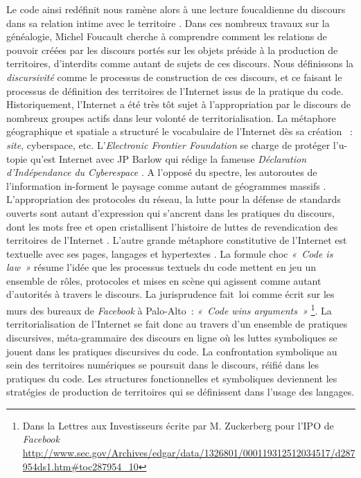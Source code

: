 Le code ainsi redéfinit nous ramène alors à une lecture foucaldienne du discours dans sa relation intime avec le territoire \citep{Foucault2004}. Dans ces nombreux travaux sur la généalogie, Michel Foucault cherche à comprendre comment les relations de pouvoir créées par les discours portés sur les objets préside à la production de territoires, d’interdits comme autant de sujets de ces discours. Nous définissons la \textit{discursivité} comme le processus de construction de ces discours, et ce faisant le processus de définition des territoires de l’Internet issus de la pratique du code. Historiquement, l’Internet a été très tôt sujet à l’appropriation par le discours de nombreux groupes actifs dans leur volonté de territorialisation. La métaphore géographique et spatiale a structuré le vocabulaire de l’Internet dès sa création \citep{Graham1998} : \textit{site}, cyberspace, etc. L’\textit{Electronic Frontier Foundation} se charge de protéger l’u-topie qu’est Internet avec JP Barlow qui rédige la fameuse \textit{Déclaration d’Indépendance du Cyberespace} \citep{Barlow2001}. A l’opposé du spectre, les autoroutes de l’information in-forment le paysage comme autant de géogrammes massifs \citep{Berque1999}. L’appropriation des protocoles du réseau, la lutte pour la défense de standards ouverts sont autant d’expression qui s’ancrent dans les pratiques du discours, dont les mots free et open cristallisent l’histoire de luttes de revendication des territoires de l’Internet \citep{Blondeau2000}. L’autre grande métaphore constitutive de l’Internet est textuelle avec ses pages, langages et hypertextes \citep{Vandendorpe1999}. La formule choc \textit{« Code is law »} \citep{Lessig2009} résume l’idée  que les processus textuels du code mettent en jeu un ensemble de rôles, protocoles et mises en scène qui agissent comme autant d’autorités à travers le discours. La jurisprudence fait loi comme écrit sur les murs des bureaux de \textit{Facebook} à Palo-Alto : \textit{« Code wins arguments »} \footnote{Dans la Lettres aux Investisseurs écrite par M. Zuckerberg  pour l’IPO de \textit{Facebook} \url{http://www.sec.gov/Archives/edgar/data/1326801/000119312512034517/d287954ds1.htm\#toc287954_10}}. La territorialisation de l’Internet se fait donc au travers d’un ensemble de pratiques discursives, méta-grammaire des discours en ligne où les luttes symboliques se jouent dans les pratiques discursives du code. La confrontation symbolique au sein des territoires numériques se poursuit dans le discours, réifié dans les pratiques du code. Les structures fonctionnelles et symboliques deviennent les stratégies de production de territoires qui se définissent dans l’usage des langages. 

